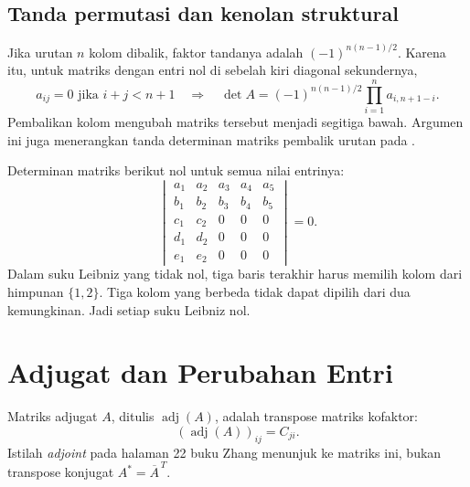 \subsection{Tanda permutasi dan kenolan struktural}
Jika urutan $n$ kolom dibalik, faktor tandanya adalah
$(-1)^{n(n-1)/2}$. Karena itu, untuk matriks dengan entri nol
di sebelah kiri diagonal sekundernya,
\[
      a_{ij}=0\text{ jika }i+j<n+1
      \quad\Longrightarrow\quad
      \det A=(-1)^{n(n-1)/2}\prod_{i=1}^n a_{i,n+1-i}.
\]
Pembalikan kolom mengubah matriks tersebut menjadi segitiga bawah.
Argumen ini juga menerangkan tanda determinan matriks pembalik urutan
pada \citet[Soal 2.31]{zhang2009}.

\begin{exam}
      Determinan matriks berikut nol untuk semua nilai entrinya:
      \[
            \begin{vmatrix}
                  a_1 & a_2 & a_3 & a_4 & a_5 \\b_1&b_2&b_3&b_4&b_5\\
                  c_1 & c_2 & 0   & 0   & 0   \\d_1&d_2&0&0&0\\e_1&e_2&0&0&0
            \end{vmatrix}=0.
      \]
      Dalam suku Leibniz yang tidak nol, tiga baris terakhir harus memilih
      kolom dari himpunan $\{1,2\}$. Tiga kolom yang berbeda tidak dapat
      dipilih dari dua kemungkinan. Jadi setiap suku Leibniz nol.
\end{exam}

\section{Adjugat dan Perubahan Entri}
\label{det:adjugat}

\begin{defi}[Adjugat]
      Matriks adjugat $A$, ditulis $\operatorname{adj}(A)$, adalah transpose
      matriks kofaktor:
      \[
            (\operatorname{adj}(A))_{ij}=C_{ji}.
      \]
      Istilah \emph{adjoint} pada halaman 22 buku Zhang menunjuk ke matriks
      ini, bukan transpose konjugat $A^*=\overline A^{\,T}$.
\end{defi}

